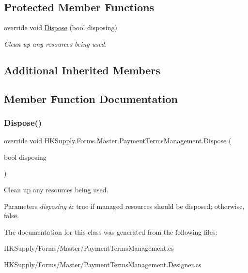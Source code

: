 \subsection*{Protected Member Functions}
\begin{DoxyCompactItemize}
\item 
override void \mbox{\hyperlink{class_h_k_supply_1_1_forms_1_1_master_1_1_payment_terms_management_a135009650e2c1aa0781b3703dbd05c20}{Dispose}} (bool disposing)
\begin{DoxyCompactList}\small\item\em Clean up any resources being used. \end{DoxyCompactList}\end{DoxyCompactItemize}
\subsection*{Additional Inherited Members}


\subsection{Member Function Documentation}
\mbox{\label{class_h_k_supply_1_1_forms_1_1_master_1_1_payment_terms_management_a135009650e2c1aa0781b3703dbd05c20}} 
\subsubsection{\texorpdfstring{Dispose()}{Dispose()}}
{\footnotesize\ttfamily override void H\+K\+Supply.\+Forms.\+Master.\+Payment\+Terms\+Management.\+Dispose (\begin{DoxyParamCaption}\item[{bool}]{disposing }\end{DoxyParamCaption})\hspace{0.3cm}{\ttfamily [protected]}}



Clean up any resources being used. 


\begin{DoxyParams}{Parameters}
{\em disposing} & true if managed resources should be disposed; otherwise, false.\\
\hline
\end{DoxyParams}


The documentation for this class was generated from the following files\+:\begin{DoxyCompactItemize}
\item 
H\+K\+Supply/\+Forms/\+Master/Payment\+Terms\+Management.\+cs\item 
H\+K\+Supply/\+Forms/\+Master/Payment\+Terms\+Management.\+Designer.\+cs\end{DoxyCompactItemize}

